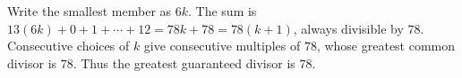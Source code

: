 Write the smallest member as $6k$. The sum is $13(6k)+0+1+\cdots+12=78k+78=78(k+1)$, always divisible by $78$. Consecutive choices of $k$ give consecutive multiples of $78$, whose greatest common divisor is $78$. Thus the greatest guaranteed divisor is $\boxed{78}$.
